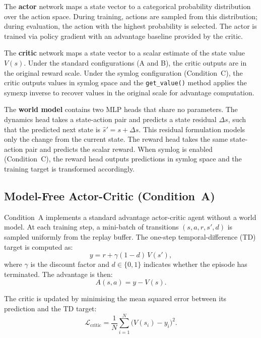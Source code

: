 The \textbf{actor} network maps a state vector to a categorical probability
distribution over the action space. During training, actions are sampled
from this distribution; during evaluation, the action with the highest probability
is selected. The actor is trained via policy gradient with an advantage baseline provided by the critic.

The \textbf{critic} network maps a state vector to a scalar estimate of the state
value $V(s)$. Under the standard configurations (A and B), the critic
outputs are in the original reward scale. Under the symlog configuration
(Condition~C), the critic outputs values in symlog space and the
\texttt{get\_value()} method applies the symexp inverse to recover
values in the original scale for advantage computation.

The \textbf{world model} contains two MLP heads that share no parameters. The
dynamics head takes a state-action pair and predicts a state residual $\Delta s$,
such that the predicted next state is $\hat{s}' = s + \Delta s$. This residual
formulation models only the change from the current state. The reward
head takes the same state-action pair and predicts the scalar reward. When symlog
is enabled (Condition~C), the reward head outputs predictions in symlog space and
the training target is transformed accordingly.

\subsection{Model-Free Actor-Critic (Condition~A)}
\label{subsec:method_mfac}

Condition~A implements a standard advantage actor-critic agent without a world
model. At each training step, a mini-batch of transitions
$(s, a, r, s', d)$ is sampled uniformly from the replay buffer. The one-step
temporal-difference (TD) target is computed as:
\begin{equation}
    \label{eq:td_target}
    y = r + \gamma (1 - d)\, V(s'),
\end{equation}
where $\gamma$ is the discount factor and $d \in \{0, 1\}$ indicates whether the
episode has terminated. The advantage is then:
\begin{equation}
    \label{eq:advantage}
    A(s, a) = y - V(s).
\end{equation}

The critic is updated by minimising the mean squared error between its prediction
and the TD target:
\begin{equation}
    \label{eq:critic_loss}
    \mathcal{L}_{\text{critic}} = \frac{1}{N} \sum_{i=1}^{N} \bigl( V(s_i) - y_i \bigr)^2.
\end{equation}

